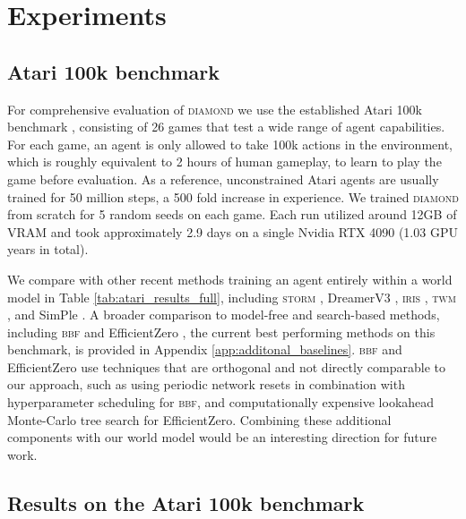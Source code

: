 \vspace{-5mm}
\section{Experiments}
\label{sec:experiments}

\vspace{-1mm}
\subsection{Atari 100k benchmark}
\label{subsec:atari100k}
For comprehensive evaluation of \textsc{diamond} we use the established Atari 100k benchmark \citep{kaiser2019atari100k}, consisting of 26 games that test a wide range of agent capabilities. 
For each game, an agent is only allowed to take 100k actions in the environment, which is roughly equivalent to 2 hours of human gameplay, to learn to play the game before evaluation. 
As a reference, unconstrained Atari agents are usually trained for 50 million steps, a 500 fold increase in experience. 
We trained \textsc{diamond} from scratch for 5 random seeds on each game. 
Each run utilized around 12GB of VRAM and took approximately 2.9 days on a single Nvidia RTX 4090 (1.03 GPU years in total).



We compare with other recent methods training an agent entirely within a world model in Table \ref{tab:atari_results_full}, including \textsc{storm} \citep{zhang2023storm}, DreamerV3 \citep{hafner2023dreamerv3}, \textsc{iris} \citep{iris2023}, \textsc{twm} \citep{robine2023transformer}, and SimPle \citep{kaiser2019atari100k}. A broader comparison to model-free and search-based methods, including \textsc{bbf} \citep{schwarzer2023bigger} and EfficientZero \citep{ye2021efficientzero}, the current best performing methods on this benchmark, is provided in Appendix \ref{app:additonal_baselines}. \textsc{bbf} and EfficientZero use techniques that are orthogonal and not directly comparable to our approach, such as using periodic network resets in combination with hyperparameter scheduling for \textsc{bbf}, and computationally expensive lookahead Monte-Carlo tree search for EfficientZero. Combining these additional components with our world model would be an interesting direction for future work.

\subsection{Results on the Atari 100k benchmark}
\label{subsec:results}

